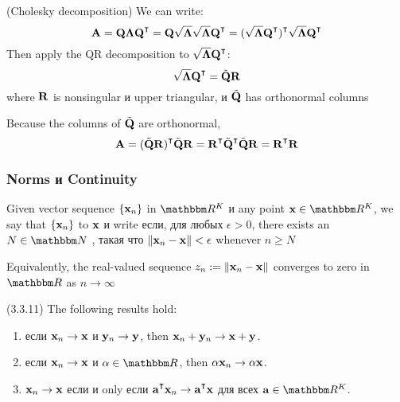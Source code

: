 \begin{frame}

    \vspace{2em}
    \Prf (Cholesky decomposition)
    We can write:
        \begin{equation*}
            \boldA 
            = \boldQ \boldLambda \boldQ^\T
            = \boldQ \sqrt{\boldLambda} \sqrt{ \boldLambda} \boldQ^\T
            = (\sqrt{ \boldLambda} \boldQ^\T)^\T \sqrt{ \boldLambda} \boldQ^\T
        \end{equation*}
    Then apply the QR decomposition to $\sqrt{ \boldLambda} \boldQ^\T$:
        $$\sqrt{ \boldLambda} \boldQ^\T = \tilde \boldQ \boldR$$
    where $\mathbf R$ is nonsingular и upper triangular, и $\tilde {\mathbf Q}$ has
    orthonormal columns
    
    \vspace{.7em}
    Because the columns of $\tilde {\mathbf Q}$ are orthonormal,
        \begin{equation*}
        \boldA 
        = (\tilde \boldQ \boldR)^\T \tilde \boldQ \boldR
        =  \boldR^\T \tilde \boldQ^\T \tilde \boldQ \boldR
        =  \boldR^\T \boldR
        \end{equation*}
    
\end{frame}


\begin{frame}

    \vspace{2em}
    \frametitle{Norms и Continuity}
    
    Given vector sequence $\{{\mathbf x}_n\}$ in $\RR^K$ и any point $\boldx \in \RR^K$, we say that $\{{\mathbf x}_n\}$  to ${\mathbf x}$ и write
     если, для любых $\epsilon > 0$, there exists an $N
    \in \NN$ , такая что $\|{\mathbf x}_n - {\mathbf x}\| < \epsilon$ whenever $n \geq N$
    
    \vspace{.7em}
    Equivalently, the real-valued sequence $z_n := \|{\mathbf x}_n - {\mathbf x}\|$
    converges to zero in $\RR$ as $n \to \infty$

\end{frame}

\begin{frame}
    
    \vspace{2em}
    \Fact (3.3.11)
    The following results hold:
    \begin{enumerate}
        \item если ${\mathbf x}_n \to {\mathbf x}$ и ${\mathbf y}_n \to {\mathbf y}$, then ${\mathbf x}_n +
            {\mathbf y}_n \to {\mathbf x} +  {\mathbf y}$.
        \item если ${\mathbf x}_n \to {\mathbf x}$ и $\alpha \in \RR$, then $\alpha {\mathbf x}_n 
            \to \alpha {\mathbf x}$.
        \item ${\mathbf x}_n \to {\mathbf x}$ если и only если $\bolda^\T \boldx_n \to
            \bolda^\T \boldx$ для всех $\bolda \in \RR^K$.
    \end{enumerate}


\end{frame}

